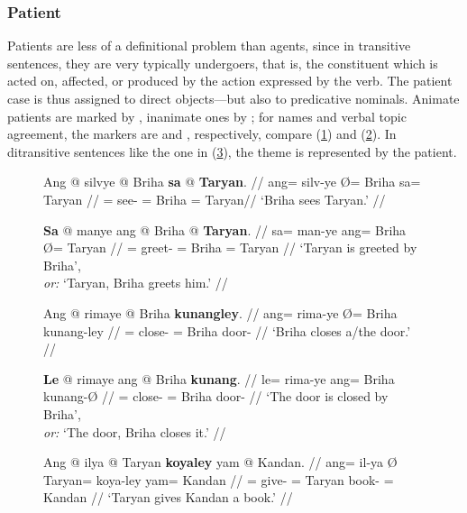 
\subsubsection{Patient}

Patients are less of a definitional problem than agents, since in transitive
sentences, they are very typically undergoers, that is, the constituent which
is acted on, affected, or produced by the action expressed by the verb. The
patient case is thus assigned to direct objects---but also to predicative
nominals. Animate patients are marked by , inanimate ones by
; for names and verbal topic agreement, the markers are
 and , respectively, compare (\ref{ex:patmarking1})
and (\ref{ex:patmarking2}). In ditransitive sentences like the one in
(\ref{ex:ditrpat}), the theme is represented by the patient.

\begin{figure}
\pex\label{ex:patmarking1}
\a\begingl
	\gla Ang @ silvye {} @ Briha \textbf{sa} @ \textbf{Taryan}. //
	\glb ang= silv-ye Ø= Briha sa= Taryan //
	\glc \AgtT{}= see-\TsgF{} \Top{}= Briha \Parg{}= Taryan//
	\glft `Briha sees Taryan.' //
\endgl

\a\begingl
	\gla \textbf{Sa} @ manye ang @ Briha {} @ \textbf{Taryan}. //
	\glb sa= man-ye ang= Briha Ø= Taryan //
	\glc \PatT{}= greet-\TsgF{} \Aarg{}= Briha \Top{}= Taryan //
	\glft `Taryan is greeted by Briha',\\
		\textit{or:} `Taryan, Briha greets him.' //
\endgl
\xe
\end{figure}

\begin{figure}
\pex\label{ex:patmarking2}
\a\begingl
	\gla Ang @ rimaye {} @ Briha \textbf{kunangley}. //
	\glb ang= rima-ye Ø= Briha kunang-ley //
	\glc \AgtT{}= close-\TsgF{} \Top{}= Briha door-\PargI{} //
	\glft `Briha closes a/the door.' //
\endgl

\a\begingl
	\gla \textbf{Le} @ rimaye ang @ Briha \textbf{kunang}. //
	\glb le= rima-ye ang= Briha kunang-Ø //
	\glc \PatTI{}= close-\TsgF{} \Aarg{}= Briha door-\Top{} //
	\glft `The door is closed by Briha',\\
		\textit{or:} `The door, Briha closes it.' //
\endgl
\xe
\end{figure}

\begin{figure}
\ex\label{ex:ditrpat}
\begingl
	\gla Ang @ ilya {} @ Taryan \textbf{koyaley} yam @ Kandan. //
	\glb ang= il-ya Ø Taryan= koya-ley yam= Kandan //
	\glc \AgtT{}= give-\TsgM{} \Top{}= Taryan book-\PargI{} \Dat{}= Kandan //
	\glft `Taryan gives Kandan a book.' //
\endgl
\xe
\end{figure}

